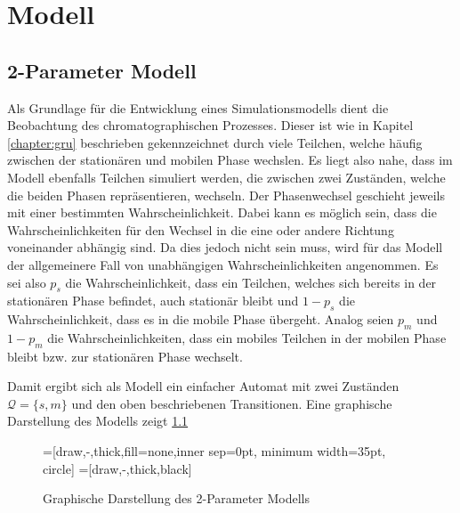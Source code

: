 \chapter{Modell} %
\label{chapter:mod}

\section{2-Parameter Modell}

Als Grundlage für die Entwicklung eines Simulationsmodells dient die Beobachtung des chromatographischen Prozesses. Dieser ist wie in Kapitel \ref{chapter:gru} beschrieben gekennzeichnet durch viele Teilchen, welche häufig zwischen der stationären und mobilen Phase wechslen. Es liegt also nahe, dass im Modell ebenfalls Teilchen simuliert werden, die zwischen zwei Zuständen, welche die beiden Phasen repräsentieren, wechseln. Der Phasenwechsel geschieht jeweils mit einer bestimmten Wahrscheinlichkeit. Dabei kann es möglich sein, dass die Wahrscheinlichkeiten für den Wechsel in die eine oder andere Richtung voneinander abhängig sind. Da dies jedoch nicht sein muss, wird für das Modell der allgemeinere Fall von unabhängigen Wahrscheinlichkeiten angenommen. Es sei also $p_s$ die Wahrscheinlichkeit, dass ein Teilchen, welches sich bereits in der stationären Phase befindet, auch stationär bleibt und $1-p_s$ die Wahrscheinlichkeit, dass es in die mobile Phase übergeht. Analog seien $p_m$ und $1-p_m$ die Wahrscheinlichkeiten, dass ein mobiles Teilchen in der mobilen Phase bleibt bzw. zur stationären Phase wechselt. 


Damit ergibt sich als Modell ein einfacher Automat mit zwei Zuständen $\mathcal{Q} = \{s, m\}$ und den oben beschriebenen Transitionen. Eine graphische Darstellung des Modells zeigt \ref{tikz:2p_Mod} 

\begin{figure}[h]
 \centering

\usetikzlibrary{arrows,%
                topaths}%
=[draw,-,thick,fill=none,inner sep=0pt, minimum width=35pt, circle]
=[draw,-,thick,black]
\usetikzlibrary{arrows,decorations.pathmorphing,backgrounds,positioning,fit}


\caption{Graphische Darstellung des 2-Parameter Modells}
\label{tikz:2p_Mod}
\end{figure}

